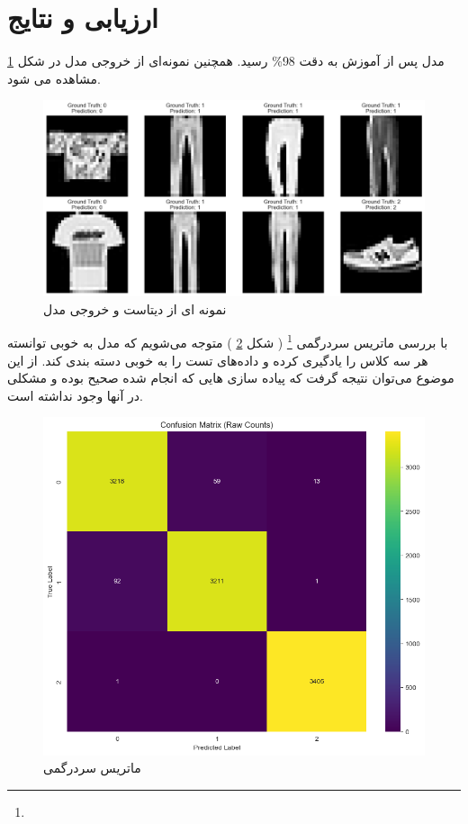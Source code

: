\documentclass[11pt]{article}
\begin{document}
	\section{ارزیابی و نتایج}
	مدل پس از آموزش به دقت
	98\%
	رسید. همچنین نمونه‌ای از خروجی مدل در شکل
	\ref{fig: output}
	مشاهده می شود.\\
	\begin{figure}[H]
		\centering
		\includegraphics[scale=0.5]{figs/output}
		\caption{نمونه ای از دیتاست و خروجی مدل}
		\label{fig: output}
	\end{figure}
	با بررسی ماتریس سردرگمی
	\footnote{}
	(
	شکل
	\ref{fig: conf mat}
	)
	متوجه می‌شویم که مدل به خوبی توانسته هر سه کلاس را یادگیری کرده و داده‌های تست را به خوبی دسته بندی کند. از این موضوع می‌توان نتیجه گرفت که پیاده سازی هایی که انجام شده صحیح بوده و مشکلی در آنها وجود نداشته است.
	\begin{figure}[H]
		\centering
		\includegraphics[scale=0.6]{figs/confMat}
		\caption{ماتریس سردرگمی}
		\label{fig: conf mat}
	\end{figure}
	
	
	
	
	
	
	
	
	
	
	
	
	
	
	
	
	
	
	
	
	
\end{document}
